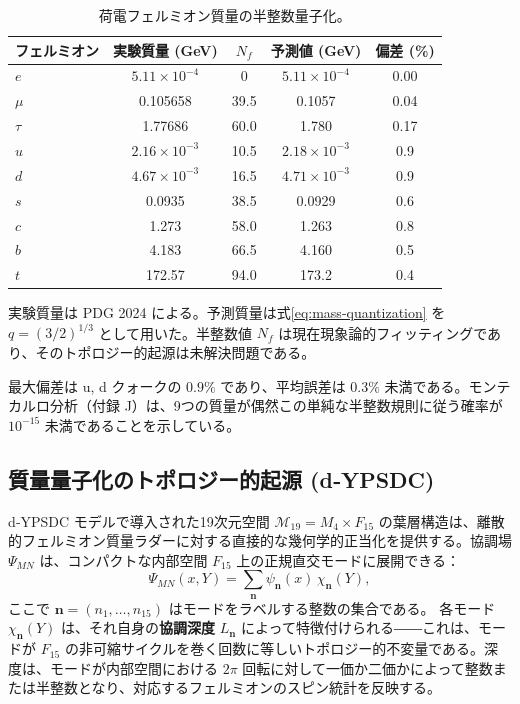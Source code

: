 \documentclass[12pt,a4paper]{article}
\begin{document}
	\begin{table}[H]
		\centering
		\caption{荷電フェルミオン質量の半整数量子化。}
		\label{tab:fermions}
		\begin{tabular}{l c c c c}
			\toprule
			フェルミオン & 実験質量 (GeV) & \(N_f\) & 予測値 (GeV) & 偏差 (\%) \\
			\midrule
			\(e\)   & \(5.11\times10^{-4}\) & 0      & \(5.11\times10^{-4}\) & 0.00 \\
			\(\mu\)  & 0.105658             & 39.5   & 0.1057               & 0.04 \\
			\(\tau\) & 1.77686              & 60.0   & 1.780                & 0.17 \\
			\(u\)   & \(2.16\times10^{-3}\) & 10.5   & \(2.18\times10^{-3}\) & 0.9 \\
			\(d\)   & \(4.67\times10^{-3}\) & 16.5   & \(4.71\times10^{-3}\) & 0.9 \\
			\(s\)   & 0.0935               & 38.5   & 0.0929               & 0.6 \\
			\(c\)   & 1.273                & 58.0   & 1.263                & 0.8 \\
			\(b\)   & 4.183                & 66.5   & 4.160                & 0.5 \\
			\(t\)   & 172.57               & 94.0   & 173.2                & 0.4 \\
			\bottomrule
		\end{tabular}
		\par\smallskip
		\footnotesize
		実験質量は PDG 2024 による。予測質量は式\eqref{eq:mass-quantization} を \(q = (3/2)^{1/3}\) として用いた。半整数値 \(N_f\) は現在現象論的フィッティングであり、そのトポロジー的起源は未解決問題である。
	\end{table}
	
	最大偏差は u, d クォークの \(0.9\%\) であり、平均誤差は \(0.3\%\) 未満である。モンテカルロ分析（付録 J）は、9つの質量が偶然この単純な半整数規則に従う確率が \(10^{-15}\) 未満であることを示している。
	
	\subsection{質量量子化のトポロジー的起源 (d‑YPSDC)}
	\label{subsec:topo-mass}
	\label{sec:d-ypsdc-model}
	
	d‑YPSDC モデルで導入された19次元空間 \(\mathcal{M}_{19}=M_4\times F_{15}\) の葉層構造は、離散的フェルミオン質量ラダーに対する直接的な幾何学的正当化を提供する。協調場 \(\Psi_{MN}\) は、コンパクトな内部空間 \(F_{15}\) 上の正規直交モードに展開できる：
	\begin{equation}
		\Psi_{MN}(x,Y) = \sum_{\mathbf{n}} \psi_{\mathbf{n}}(x)\, \chi_{\mathbf{n}}(Y),
		\label{eq:mode-exp}
	\end{equation}
	ここで \(\mathbf{n}=(n_1,\dots,n_{15})\) はモードをラベルする整数の集合である。
	各モード \(\chi_{\mathbf{n}}(Y)\) は、それ自身の\textbf{協調深度} \(L_{\mathbf{n}}\) によって特徴付けられる――これは、モードが \(F_{15}\) の非可縮サイクルを巻く回数に等しいトポロジー的不変量である。深度は、モードが内部空間における \(2\pi\) 回転に対して一価か二価かによって整数または半整数となり、対応するフェルミオンのスピン統計を反映する。
	
\end{document}
